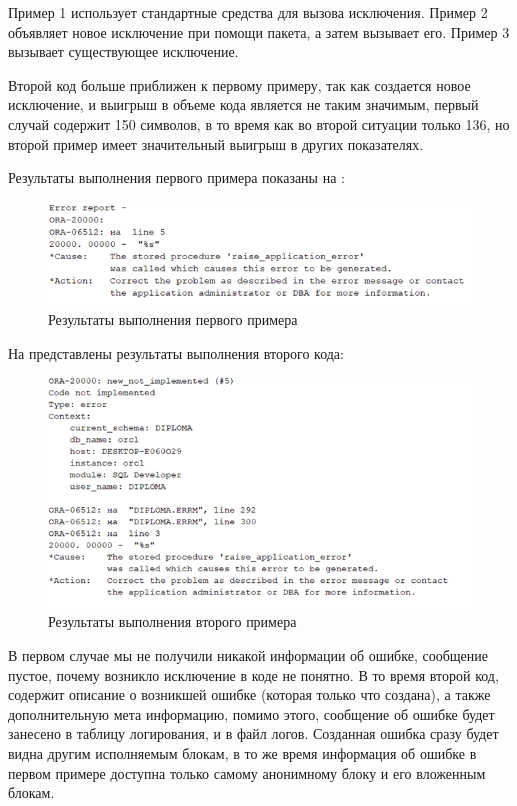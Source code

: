 Пример 1 использует стандартные средства для вызова исключения. Пример 2 объявляет новое исключение при помощи пакета, а затем вызывает его. Пример 3 вызывает существующее исключение. 

Второй код больше приближен к первому примеру, так как создается новое исключение, и выигрыш в объеме кода является не таким значимым, первый случай содержит 150 символов, в то время как во второй ситуации только 136, но второй пример имеет значительный выигрыш в других показателях. 

Результаты выполнения первого примера показаны на :

\begin{figure}[ht!] 
	\center
	\includegraphics [scale=1] {my_folder/img/c4_1_example_res.png}
	\caption{Результаты выполнения первого примера} 
	\label{fig:c4_1_example_res}  
\end{figure}
\FloatBarrier

На  представлены результаты выполнения второго кода:

\begin{figure}[ht!] 
	\center
	\includegraphics [scale=1] {my_folder/img/c4_2_example_res.png}
	\caption{Результаты выполнения второго примера} 
	\label{fig:c4_2_example_res}  
\end{figure}
\FloatBarrier

В первом случае мы не получили никакой информации об ошибке, сообщение пустое, почему возникло исключение в коде не понятно. В то время второй код, содержит описание о возникшей ошибке (которая только что создана), а также дополнительную мета информацию, помимо этого, сообщение об ошибке будет занесено в таблицу логирования, и в файл логов. Созданная ошибка сразу будет видна другим исполняемым блокам, в то же время информация об ошибке в первом примере доступна только самому анонимному блоку и его вложенным блокам. 


